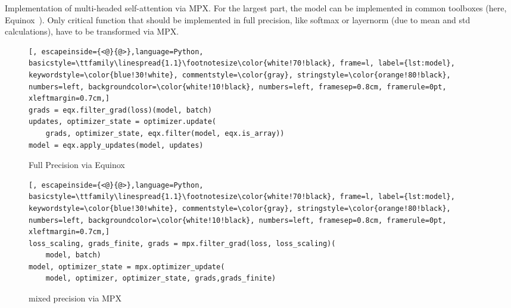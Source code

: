 \documentclass[10pt, a4paper, logo, onecolumn, internal, copyright]{dsme}
\newcommand{\mpx}{\textsc{MPX}}
\begin{document}
\begin{example}[h]
    \centering
    \caption{Implementation of multi-headed self-attention via MPX. For the largest part, the model can be implemented in common toolboxes (here, Equinox~\cite{kidger2021equinox}). Only critical function that should be implemented in full precision, like softmax or layernorm (due to mean and std calculations), have to be transformed via \mpx{}.}
    \label{ex:update}
    \begin{subfigure}[t]{0.98\textwidth}
        \centering
        \caption{Full Precision via Equinox}
        \vspace{-0.4cm}
        \begin{mdframed}[
            backgroundcolor=white!10!black,
            leftmargin=0.5cm,hidealllines=true,%
            innerleftmargin=0.2cm,innerrightmargin=0.2cm,innertopmargin=0cm,innerbottommargin=-0.10cm
        ]
            \begin{lstlisting}[, escapeinside={<@}{@>},language=Python, basicstyle=\ttfamily\linespread{1.1}\footnotesize\color{white!70!black}, frame=l, label={lst:model}, keywordstyle=\color{blue!30!white}, commentstyle=\color{gray}, stringstyle=\color{orange!80!black}, numbers=left, backgroundcolor=\color{white!10!black}, numbers=left, framesep=0.8cm, framerule=0pt,  xleftmargin=0.7cm,]
grads = eqx.filter_grad(loss)(model, batch)
updates, optimizer_state = optimizer.update(
    grads, optimizer_state, eqx.filter(model, eqx.is_array))
model = eqx.apply_updates(model, updates)
            \end{lstlisting}
        \end{mdframed}
    \end{subfigure}\hspace{0.1cm}
    \begin{subfigure}[t]{0.98\textwidth}
        \centering
        \vspace{0.2cm}
        \caption{mixed precision via MPX}
        \vspace{-0.4cm}
        \begin{mdframed}[
            backgroundcolor=white!10!black,
            leftmargin=0.5cm,hidealllines=true,%
            innerleftmargin=0.2cm,innerrightmargin=0.2cm,innertopmargin=0cm,innerbottommargin=-0.10cm
        ]
            \begin{lstlisting}[, escapeinside={<@}{@>},language=Python, basicstyle=\ttfamily\linespread{1.1}\footnotesize\color{white!70!black}, frame=l, label={lst:model}, keywordstyle=\color{blue!30!white}, commentstyle=\color{gray}, stringstyle=\color{orange!80!black}, numbers=left, backgroundcolor=\color{white!10!black}, numbers=left, framesep=0.8cm, framerule=0pt,  xleftmargin=0.7cm,]
loss_scaling, grads_finite, grads = mpx.filter_grad(loss, loss_scaling)(
    model, batch)
model, optimizer_state = mpx.optimizer_update(
    model, optimizer, optimizer_state, grads,grads_finite)
            \end{lstlisting}
        \end{mdframed}
    \end{subfigure}

\end{example}
\end{document}
